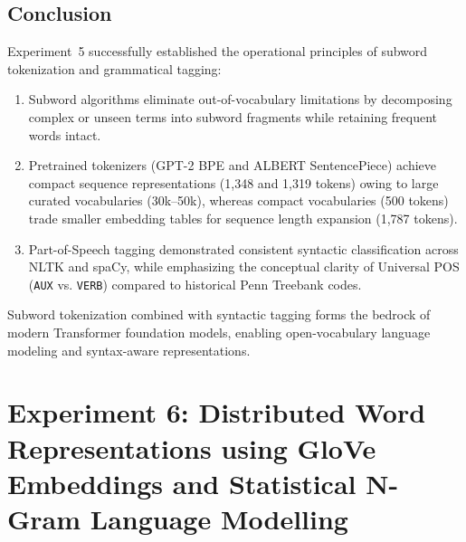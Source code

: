 \documentclass[12pt,a4paper]{report}
\begin{document}
\section{Conclusion}
Experiment~5 successfully established the operational principles of subword tokenization and grammatical tagging:
\begin{enumerate}
    \item Subword algorithms eliminate out-of-vocabulary limitations by decomposing complex or unseen terms into subword fragments while retaining frequent words intact.
    \item Pretrained tokenizers (GPT-2 BPE and ALBERT SentencePiece) achieve compact sequence representations (1,348 and 1,319 tokens) owing to large curated vocabularies (30k--50k), whereas compact vocabularies (500 tokens) trade smaller embedding tables for sequence length expansion (1,787 tokens).
    \item Part-of-Speech tagging demonstrated consistent syntactic classification across NLTK and spaCy, while emphasizing the conceptual clarity of Universal POS (\texttt{AUX} vs. \texttt{VERB}) compared to historical Penn Treebank codes.
\end{enumerate}
Subword tokenization combined with syntactic tagging forms the bedrock of modern Transformer foundation models, enabling open-vocabulary language modeling and syntax-aware representations.



\chapter{Experiment 6: Distributed Word Representations using GloVe Embeddings and Statistical N-Gram Language Modelling}
\label{chap:exp6}
\end{document}
